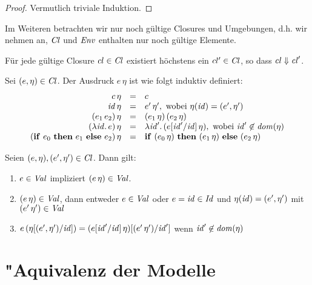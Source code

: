 \documentclass[12pt,fleqn]{article}
\newcommand{\Cl}{\name{Cl}}
\newcommand{\cl}{\name{cl}}
\begin{document}
\begin{proof}
  Vermutlich triviale Induktion.
\end{proof}

Im Weiteren betrachten wir nur noch g\"ultige Closures und Umgebungen, d.h. wir nehmen an,
$\Cl$ und ${\text{\it Env\/}}$ enthalten nur noch g\"ultige Elemente.

\begin{lemma}
  F\"ur jede g\"ultige Closure $cl\in\Cl$ existiert h\"ochstens ein $cl'\in\Cl$, so dass
  $\cl \Downarrow \cl'$.
\end{lemma}

\begin{definition} \label{definition:Substitution}
  Sei $(e,\eta) \in \Cl$. Der Ausdruck $e\,\eta$ ist wie folgt
  induktiv definiert:
  \[\begin{array}{rcl}
    c\,\eta &=& c \\
    {\text{\it id\/}}\,\eta &=& e'\,\eta', \text{ wobei } \eta({\text{\it id\/}}) = (e',\eta') \\
    (e_1\,e_2)\,\eta &=& (e_1\,\eta)\,(e_2\,\eta) \\
    (\lambda {\text{\it id\/}}.\,e)\,\eta &=& \lambda {\text{\it id\/}}'.\,(e[{\text{\it id\/}}'/{\text{\it id\/}}]\,\eta), \text{ wobei } {\text{\it id\/}}'\not\in{\text{\it dom\/}}(\eta) \\
    (\mathbf{if}\ e_0\ \mathbf{then}\ e_1\ \mathbf{else}\ e_2)\,\eta &=& \mathbf{if}\ (e_0\,\eta)\ \mathbf{then}\ (e_1\,\eta)\ \mathbf{else}\ (e_2\,\eta)
  \end{array}\]
\end{definition}

\begin{lemma} \label{lemma:Substitution}
  Seien $(e,\eta), (e',\eta') \in \Cl$. Dann gilt:
  \begin{enumerate}
    \item $e\in{\text{\it Val\/}}$ impliziert $(e\,\eta)\in{\text{\it Val\/}}$.
    \item $(e\,\eta)\in{\text{\it Val\/}}$, dann entweder $e\in{\text{\it Val\/}}$ oder
          $e={\text{\it id\/}}\in{\text{\it Id\/}}$ und $\eta({\text{\it id\/}}) = (e',\eta')$ mit $(e'\,\eta')\in{\text{\it Val\/}}$
    \item $e\,(\eta[(e',\eta')/{\text{\it id\/}}]) = (e[{\text{\it id\/}}'/{\text{\it id\/}}]\,\eta)[(e'\,\eta')/{\text{\it id\/}}']$ wenn ${\text{\it id\/}}' \not\in {\text{\it dom\/}}(\eta)$
  \end{enumerate}
\end{lemma}


\section{"Aquivalenz der Modelle}
\end{document}
